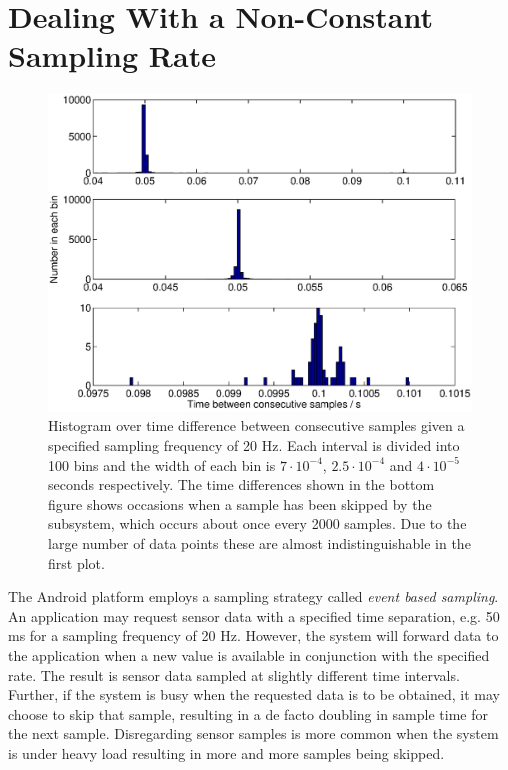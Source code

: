 \documentclass{LTHthesis}
\begin{document}
\section{Dealing With a Non-Constant Sampling Rate}
%
\begin{figure}[!hbt]

\includegraphics[width=1\textwidth ]{images/kinematic/sample_diff}
\caption{Histogram over time difference between consecutive samples given a specified sampling frequency of 20 Hz. Each interval is divided into 100 bins and the width of each bin is $7\cdot10^{-4}$, $2.5\cdot10^{-4}$ and $4\cdot10^{-5}$ seconds respectively. The time differences shown in the bottom figure shows occasions when a sample has been skipped by the subsystem, which occurs about once every 2000 samples. Due to the large number of data points these are almost indistinguishable in the first plot.}\label{sample_diff}
\end{figure}
%
The Android platform employs a sampling strategy called \emph{event based sampling}. An application may request sensor data with a specified time separation, e.g. 50 ms for a sampling frequency of 20 Hz. However, the system will forward data to the application when a new value is available in conjunction with the specified rate. The result is sensor data sampled at slightly different time intervals. Further, if the system is busy when the requested data is to be obtained, it may choose to skip that sample, resulting in a de facto doubling in sample time for the next sample. Disregarding sensor samples is more common when the system is under heavy load resulting in more and more samples being skipped.
\end{document}
